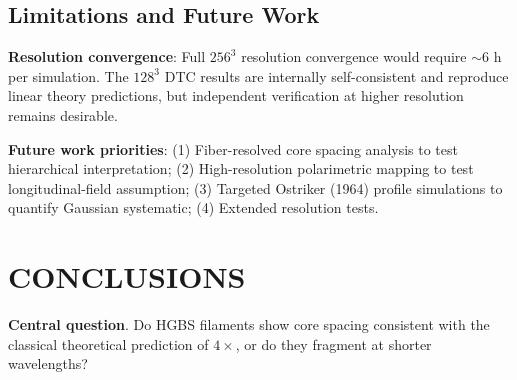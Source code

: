 \documentclass[twocolumn]{mnras}
\begin{document}
\subsection{Limitations and Future Work}

\textbf{Resolution convergence}: Full $256^3$ resolution convergence would require $\sim$6 h per simulation. The $128^3$ DTC results are internally self-consistent and reproduce linear theory predictions, but independent verification at higher resolution remains desirable.

\textbf{Future work priorities}: (1) Fiber-resolved core spacing analysis to test hierarchical interpretation; (2) High-resolution polarimetric mapping to test longitudinal-field assumption; (3) Targeted Ostriker (1964) profile simulations to quantify Gaussian systematic; (4) Extended resolution tests.

\section{CONCLUSIONS}

\textbf{Central question}. Do HGBS filaments show core spacing consistent with the classical theoretical prediction of $4\times$, or do they fragment at shorter wavelengths?
\end{document}
